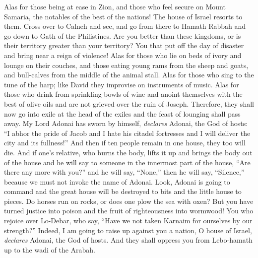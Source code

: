 \begin{biblechapter} %
 Alas for those being at ease in Zion, and those who feel secure on Mount Samaria, the notables of the best of the nations! The house of Israel resorts to them.
\verse Cross over to Calneh and see, and go from there to Hamath Rabbah and go down to Gath of the Philistines. Are you better than these kingdoms, or is their territory greater than your territory?
\verse You that put off the day of disaster and bring near a reign of violence!
\verse Alas for those who lie on beds of ivory and lounge on their couches, and those eating young rams from the sheep and goats, and bull-calves from the middle of the animal stall.
\verse Alas for those who sing to the tune of the harp; like David they improvise on instruments of music.
\verse Alas for those who drink from sprinkling bowls of wine and anoint themselves with the best of olive oils and are not grieved over the ruin of Joseph.
\verse Therefore, they shall now go into exile at the head of the exiles and the feast of lounging shall pass away.
 My Lord Adonai has sworn by himself, \textit{declares} Adonai, the God of hosts: “I abhor the pride of Jacob and I hate his citadel fortresses and I will deliver the city and its fullness!”
\verse And then if ten people remain in one house, they too will die.
\verse And if one’s relative, who burns the body, lifts it up and brings the body out of the house and he will say to someone in the innermost part of the house, “Are there any more with you?” and he will say, “None,” then he will say, “Silence,” because we must not invoke the name of Adonai.
\verse Look, Adonai is going to command and the great house will be destroyed to bits and the little house to pieces.
\verse Do horses run on rocks, or does one plow the sea with oxen? But you have turned justice into poison and the fruit of righteousness into wormwood!
\verse You who rejoice over Lo-Debar, who say, “Have we not taken Karnaim for ourselves by our strength?”
\verse Indeed, I am going to raise up against you a nation, O house of Israel, \textit{declares} Adonai, the God of hosts. And they shall oppress you from Lebo-hamath up to the wadi of the Arabah.
\end{biblechapter}

